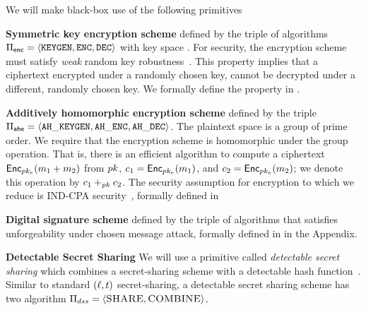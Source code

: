\NewDocumentCommand{\cciOracle}{g}{%
	\ensuremath{\algNotation{O}_{\IfNoValueTF{#1}{\$}{#1}}}\xspace}
\NewDocumentCommand{\cciLabel}{o}{%
	\textsf{cci\IfNoValueF{#1}{-{#1}}}\xspace}
\NewDocumentCommand{\indcpaRandLabel}{o}{%
	\textsf{ind-cpa\$\IfNoValueF{#1}{-{#1}}}\xspace}


%


We will make black-box use of the following primitives 


\smallskip\noindent\textbf{Symmetric key encryption scheme} defined by the triple of algorithms $\encryptionSchemeDefn$ with key space \encryptKeySpace. For security, the encryption scheme must satisfy \emph{weak} random key robustness~\cite{bhowmick2021apple}. 
 This property implies that a ciphertext encrypted under a randomly chosen key, cannot be decrypted under a different, randomly chosen key.  We formally define the property in . 


\smallskip\noindent\textbf{Additively homomorphic encryption scheme} defined by the triple $\ahencryptionSchemeDefn$.  The plaintext space is a group \group of prime order. We require that the encryption scheme is
homomorphic under the group operation. That is, there is an efficient
algorithm to compute a ciphertext $\pkencrypt[\encryptPubKey](\plaintext[1] \groupOp \plaintext[2])$
from $\pubKey$, $\ciphertext[1] = \pkencrypt[\encryptPubKey](\plaintext[1])$, and $\ciphertext[2] = \pkencrypt[\encryptPubKey](\plaintext[2])$; we denote this operation by
$\ciphertext[1]\homomorphicAdd{\pubKey} \ciphertext[2]$. The security
assumption for encryption to which we reduce is IND-CPA
security~\cite{bellare1998relations}, formally defined in 

\smallskip\noindent\textbf{Digital signature scheme} defined by the triple of algorithms \sigSchemeDefn
that satisfies unforgeability under chosen message attack, formally defined in  in the Appendix. 


\iffalse 
\smallskip\noindent\textbf{Detectable Secret Sharing}
%
We will use a primitive called \emph{detectable secret sharing} which combines a secret-sharing scheme with a detectable hash function~\cite{bhowmick2021apple}. Similar to standard $(\ell, t)$ secret-sharing, a detectable secret sharing scheme has two algorithm $\Pi_{dss} = \langle \textsc{SHARE}, \textsc{COMBINE}\rangle$. 

